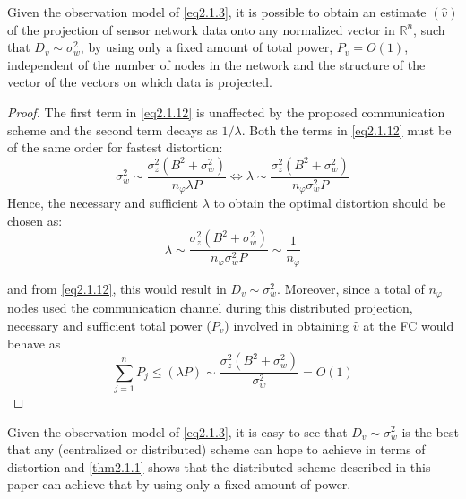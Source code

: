 \begin{theorem}
    \label{thm2.1.1}
    Given the observation model of \cref{eq2.1.3}, it is possible to obtain an estimate $(\hat{v})$ of the projection of sensor network data onto any normalized vector in $\mathbb{R}^n$, such that $D_v \sim \sigma_w^2$, by using only a fixed amount of total power, $P_v = O(1)$, independent of the number of nodes in the network and the structure of the vector of the vectors on which data is projected.
\end{theorem}

\begin{proof}
    The first term in \cref{eq2.1.12} is unaffected by the proposed communication scheme and the second term decays as $1/\lambda$. Both the terms in \cref{eq2.1.12} must be of the same order for fastest distortion:
    \begin{equation}
        \sigma_w^2 \sim \dfrac{\sigma_z^2(B^2+\sigma_w^2)}{n_{\varphi}\lambda P} \Longleftrightarrow \lambda \sim \dfrac{\sigma_z^2(B^2+\sigma_w^2)}{n_{\varphi} \sigma_w^2 P}
        \label{eq2.1.13}
    \end{equation}
    Hence, the necessary and sufficient $\lambda$ to obtain the optimal distortion should be chosen as:
\begin{equation}
    \lambda \sim \dfrac{\sigma_z^2(B^2+\sigma_w^2)}{n_{\varphi}\sigma_w^2 P} \sim \dfrac{1}{n_{\varphi}}
    \label{eq2.1.14}
\end{equation}

and from \cref{eq2.1.12}, this would result in $D_v \sim \sigma_w^2$. Moreover, since a total of $n_{\varphi}$ nodes used the communication channel during this distributed projection, necessary and sufficient total power ($P_v$) involved in obtaining $\hat{v}$ at the FC would behave as 
\begin{equation}
    \sum_{j=1}^{n}P_j \leq (\lambda P) \sim \dfrac{\sigma_z^2(B^2+\sigma_w^2)}{\sigma_w^2} = O(1)
    \label{eq2.1.15}
\end{equation}
\end{proof}


\begin{remark}
    \label{rmk2.1.1}
    Given the observation model of \cref{eq2.1.3}, it is easy to see that $D_v \sim \sigma_w^2$ is the best that any (centralized or distributed) scheme can hope to achieve in terms of distortion and \cref{thm2.1.1} shows that the distributed scheme described in this paper can achieve that by using \textcolor[rgb]{1,0,0}{only a fixed amount of power}.
\end{remark}

